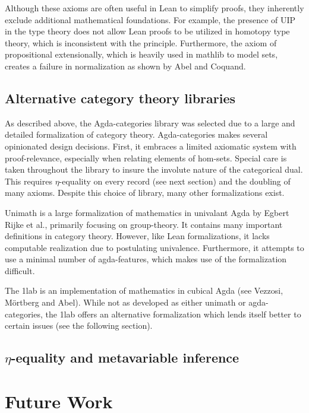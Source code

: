 \documentclass{amsart}
\theoremstyle{remark}
\begin{document}
Although these axioms are often useful in Lean to simplify proofs, they inherently exclude additional mathematical foundations. For example, the presence of UIP in the type theory does not allow Lean proofs to be utilized in homotopy type theory, which is inconsistent with the principle\cite{hottbook}. Furthermore, the axiom of propositional extensionally, which is heavily used in mathlib to model sets, creates a failure in normalization as shown by Abel and Coquand\cite{lean-normalization}.

\subsection{Alternative category theory libraries}

As described above, the Agda-categories\cite{agda:categories} library was selected due to a large and detailed formalization of category theory. Agda-categories makes several opinionated design decisions. First, it embraces a limited axiomatic system with proof-relevance, especially when relating elements of hom-sets. Special care is taken throughout the library to insure the involute nature of the categorical dual. This requires $\eta$-equality on every record (see next section) and the doubling of many axioms.
Despite this choice of library, many other formalizations exist.

Unimath\cite{agda:unimath} is a large formalization of mathematics in univalant Agda by Egbert Rijke et al., primarily focusing on group-theory. It contains many important definitions in category theory. However, like Lean formalizations, it lacks computable realization due to postulating univalence. Furthermore, it attempts to use a minimal number of agda-features, which makes use of the formalization difficult.

The 1lab\cite{agda:1lab} is an implementation of mathematics in cubical Agda (see Vezzosi, M\"{o}rtberg and Abel\cite{agda:cubical}). While not as developed as either unimath or agda-categories, the 1lab offers an alternative formalization which lends itself better to certain issues (see the following section).

\subsection{$\eta$-equality and metavariable inference}

\section{Future Work}

\printbibliography
\end{document}
